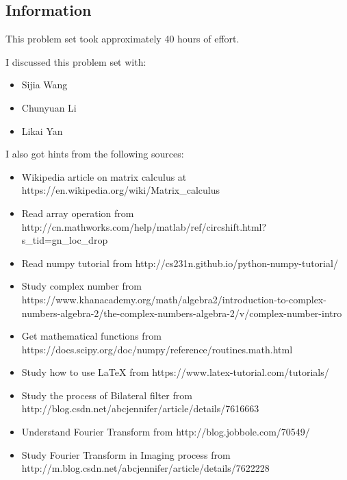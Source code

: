 \documentclass{article}
\newcommand{\info}{\clearpage \subsection*{Information}}
\begin{document}
\info

This problem set took approximately 40 hours of effort.


I discussed this problem set with:
\begin{itemize}
\item Sijia Wang
\item Chunyuan Li
\item Likai Yan
\end{itemize}


I also got hints from the following sources:
\begin{itemize}
\item Wikipedia article on matrix calculus at https://en.wikipedia.org/wiki/Matrix\_calculus
\item Read array operation from http://cn.mathworks.com/help/matlab/ref/circshift.html?s\_tid=gn\_loc\_drop
\item Read numpy tutorial from http://cs231n.github.io/python-numpy-tutorial/
\item Study complex number from https://www.khanacademy.org/math/algebra2/introduction-to-complex-numbers-algebra-2/the-complex-numbers-algebra-2/v/complex-number-intro
\item Get mathematical functions from https://docs.scipy.org/doc/numpy/reference/routines.math.html
\item Study how to use LaTeX from https://www.latex-tutorial.com/tutorials/
\item Study the process of Bilateral filter from http://blog.csdn.net/abcjennifer/article/details/7616663
\item Understand Fourier Transform from http://blog.jobbole.com/70549/
\item Study Fourier Transform in Imaging process from http://m.blog.csdn.net/abcjennifer/article/details/7622228
\end{itemize}
\end{document}

